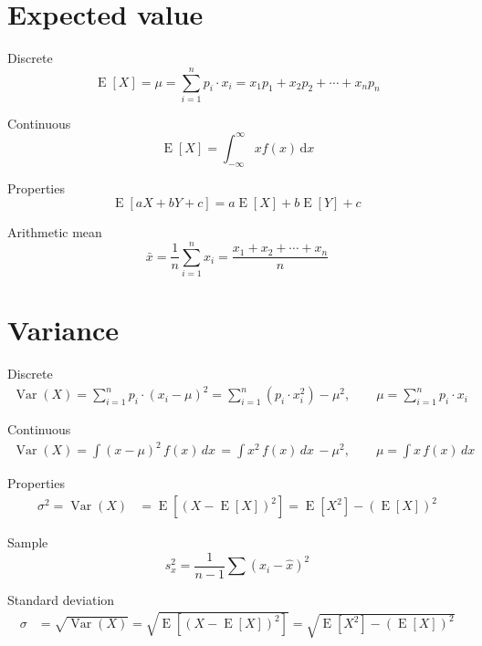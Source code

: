 \documentclass[11pt,a4paper]{article}
\begin{document}
\section*{Expected value}

Discrete
\begin{equation}
    \operatorname{E}[X] = \mu = \sum_{i=1}^n p_i\cdot x_i  = x_1p_1 + x_2p_2 + \dotsb + x_n p_n
\end{equation}

Continuous
\begin{equation}
    \operatorname{E}[X] = \int_{-\infty}^\infty x f(x)\, \mathrm{d}x
\end{equation}

Properties
\begin{equation}
\operatorname{E}[a X + b Y + c] = a \operatorname{E}[X] + b \operatorname{E}[Y] + c\,
\end{equation}

Arithmetic mean
\begin{equation}
 \bar{x} = \frac{1}{n} \sum_{i=1}^{n} x_i = \frac{x_1+x_2+\cdots +x_n}{n} 
\end{equation}


\section*{Variance}

Discrete
\begin{align}
\operatorname{Var}(X) = \sum_{i=1}^n p_i\cdot(x_i - \mu)^2 = \sum_{i=1}^n (p_i\cdot x_i^2) - \mu^2, \qquad \mu = \sum_{i=1}^n p_i\cdot x_i 
\end{align}

Continuous
\begin{align}
\operatorname{Var}(X) =\int (x-\mu)^2 \, f(x) \, dx\, =\int x^2 \, f(x) \, dx\, - \mu^2, \qquad \mu = \int x \, f(x) \, dx\, 
\end{align}

Properties
\begin{align}
\sigma^2 = \operatorname{Var}(X) &= \operatorname{E}\left[(X - \operatorname{E}[X])^2\right] = \operatorname{E}\left[X^2 \right] - (\operatorname{E}[X])^2
\end{align}

Sample
\begin{equation}
s^{2}_{x} = \frac{1}{n-1} \sum \left (x_{i}-\hat{x} \right )^{2}
\end{equation}

Standard deviation
\begin{align}
\sigma & = \sqrt{\operatorname{Var}(X)} = \sqrt{\operatorname E[(X - \operatorname{E}[X])^2]} =\sqrt{\operatorname E[X^2]-(\operatorname E[X])^2}
\end{align}
\end{document}

